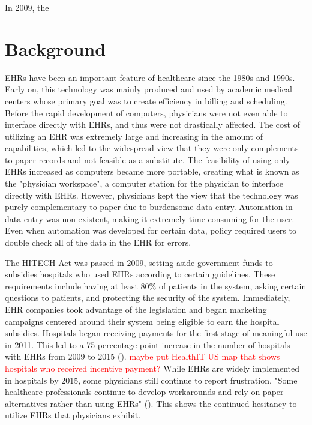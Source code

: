 \documentclass[11pt]{article}
\begin{document}
In 2009, the 



\newpage


\section{Background}

EHRs have been an important feature of healthcare since the 1980s and 1990s. Early on, this technology was mainly produced and used by academic medical centers whose primary goal was to create efficiency in billing and scheduling. Before the rapid development of computers, physicians were not even able to interface directly with EHRs, and thus were not drastically affected. The cost of utilizing an EHR was extremely large and increasing in the amount of capabilities, which led to the widespread view that they were only complements to paper records and not feasible as a substitute. The feasibility of using only EHRs increased as computers became more portable, creating what is known as the "physician workspace", a computer station for the physician to interface directly with EHRs. However, physicians kept the view that the technology was purely complementary to paper due to burdensome data entry. Automation in data entry was non-existent, making it extremely time consuming for the user. Even when automation was developed for certain data, policy required users to double check all of the data in the EHR for errors. 

The HITECH Act was passed in 2009, setting aside government funds to subsidies hospitals who used EHRs according to certain guidelines. These requirements include having at least 80\% of patients in the system, asking certain questions to patients, and protecting the security of the system. Immediately, EHR companies took advantage of the legislation and began marketing campaigns centered around their system being eligible to earn the hospital subsidies. Hospitals began receiving payments for the first stage of meaningful use in 2011. This led to a 75 percentage point increase in the number of hospitals with EHRs from 2009 to 2015 (\cite{stats}). \textcolor{red}{maybe put HealthIT US map that shows hospitals who received incentive payment?} While EHRs are widely implemented in hospitals by 2015, some physicians still continue to report frustration. "Some healthcare professionals continue to develop workarounds and rely on paper alternatives rather than using EHRs" (\cite{evans2016electronic}). This shows the continued hesitancy to utilize EHRs that physicians exhibit. 
\end{document}
